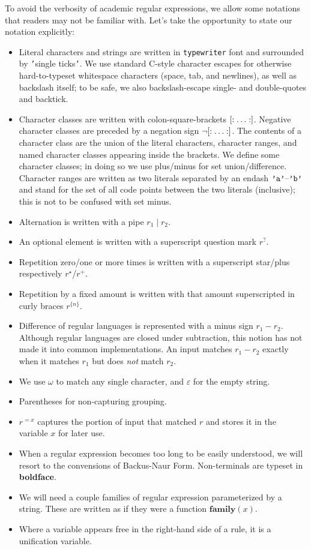 \documentclass[11pt]{article} %
\begin{document}
To avoid the verbosity of academic regular expressions, we allow some notations that readers may not be familiar with.
Let's take the opportunity to state our notation explicitly:
\begin{itemize}
  \item Literal characters and strings are written in \texttt{typewriter} font and surrounded by \texttt{'}single ticks\texttt{'}.
        We use standard C-style character escapes for otherwise hard-to-typeset whitespace characters (space, tab, and newlines), as well as backslash itself; to be safe, we also backslash-escape single- and double-quotes and backtick.
  \item Character classes are written with colon-square-brackets $\mathopen{[\mathord:\;} \ldots \mathclose{\;\mathord:]}$.
        Negative character classes are preceded by a negation sign $\mathopen{\lnot[\mathord:\;} \ldots \mathclose{\;\mathord:]}$.
        The contents of a character class are the union of the literal characters, character ranges, and named character classes appearing inside the brackets.
        We define some character classes; in doing so we use plus/minus for set union/difference.
        Character ranges are written as two literals separated by an endash $\texttt{'{a}'}\text{--}\texttt{'{b}'}$ and stand for the set of all code points between the two literals (inclusive); this is not to be confused with set minus.
  \item Alternation is written with a pipe $r_1 \mid r_2$.
  \item An optional element is written with a superscript question mark $r^?$.
  \item Repetition zero/one or more times is written with a superscript star/plus respectively $r^\star$/$r^+$.
  \item Repetition by a fixed amount is written with that amount superscripted in curly braces $r^{\{n\}}$.
  \item Difference of regular languages is represented with a minus sign $r_1 - r_2$.
        Although regular languages are closed under subtraction, this notion has not made it into common implementations.
        An input matches $r_1 - r_2$ exactly when it matches $r_1$ but does \emph{not} match $r_2$.
  \item We use $\omega$ to match any single character, and $\varepsilon$ for the empty string.
  \item Parentheses for non-capturing grouping.
  \item $r^{=x}$ captures the portion of input that matched $r$ and stores it in the variable $x$ for later use.
  \item When a regular expression becomes too long to be easily understood, we will resort to the convensions of Backus-Naur Form.
        Non-terminals are typeset in \textbf{boldface}.
  \item We will need a couple families of regular expression parameterized by a string.
        These are written as if they were a function $\mathbf{family}(x)$.
  \item Where a variable appears free in the right-hand side of a rule, it is a unification variable.
\end{itemize}
\end{document}
